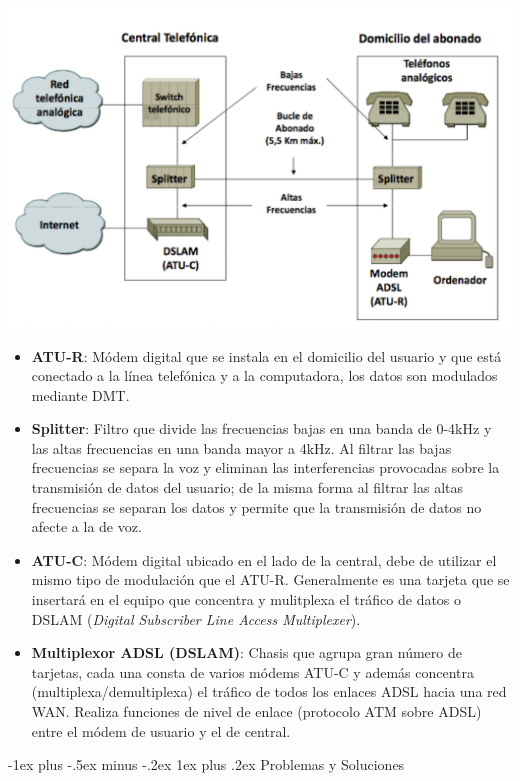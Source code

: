 \documentclass[10pt,portrait, twocolumn]{article}
\makeatletter
\renewcommand{\subsubsection}{\@startsection{subsubsection}{3}{0mm}%
                                {-1ex plus -.5ex minus -.2ex}%
                                {1ex plus .2ex}%
                                {\normalfont\small\bfseries}}
\makeatother
\begin{document}
	\begin{center}
		\includegraphics[scale=0.2]{images/ADSL}
	\end{center}
	
	\begin{itemize}
		\item \textbf{ATU-R}: Módem digital que se instala en el domicilio del usuario y que está conectado a la línea telefónica y a la computadora, los datos son modulados mediante DMT.
		\item \textbf{Splitter}: Filtro que divide las frecuencias bajas en una banda de 0-4kHz y las altas frecuencias en una banda mayor a 4kHz. Al filtrar las bajas frecuencias se separa la voz y eliminan las interferencias provocadas sobre la transmisión de datos del usuario; de la misma forma al filtrar las altas frecuencias se separan los datos y permite que la transmisión de datos no afecte a la de voz.
		\item \textbf{ATU-C}: Módem digital ubicado en el lado de la central, debe de utilizar el mismo tipo de modulación que el ATU-R. Generalmente es una tarjeta que se insertará en el equipo que concentra y mulitplexa el tráfico de datos o DSLAM (\textit{Digital Subscriber Line Access Multiplexer}).
		\item \textbf{Multiplexor ADSL (DSLAM)}: Chasis que agrupa gran número de tarjetas, cada una consta de varios módems ATU-C y además concentra (multiplexa/demultiplexa) el tráfico de todos los enlaces ADSL hacia una red WAN. Realiza funciones de nivel de enlace (protocolo ATM sobre ADSL) entre el módem de usuario y el de central.
	\end{itemize}
	
\subsubsection{Problemas y Soluciones}
\end{document}
